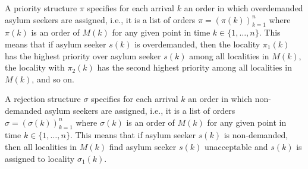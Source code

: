 \documentclass[12pt,fleqn]{article}
\begin{document}
A priority structure $\pi$ specifies for each arrival $k$ an order in which overdemanded asylum seekers are assigned, i.e., it is a list of orders $\pi=(\pi(k))_{k=1}^n$ where $\pi(k)$ is an order of $M(k)$ for any given point in time $k\in\{1,\ldots,n\}$. This means that if asylum seeker $s(k)$ is overdemanded, then the locality $\pi_1(k)$ has the highest priority over asylum seeker $s(k)$ among all localities in $M(k)$, the locality with $\pi_2(k)$ has the second highest priority among all localities in $M(k)$, and so on.

A rejection structure $\sigma$ specifies for each arrival $k$ an order in which non-demanded asylum seekers are assigned, i.e., it is a list of orders $\sigma=(\sigma(k))_{k=1}^n$ where $\sigma(k)$ is an order of $M(k)$ for any given point in time $k\in\{1,\ldots,n\}$. This means that if asylum seeker $s(k)$ is non-demanded, then all localities in $M(k)$ find asylum seeker $s(k)$ unacceptable and $s(k)$ is assigned to locality $\sigma_1(k)$.
\end{document}
